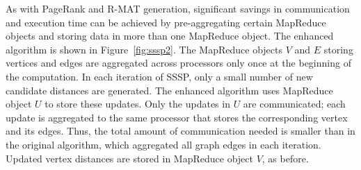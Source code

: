 As with PageRank and R-MAT generation, significant savings in
communication and execution time can be achieved by pre-aggregating
certain MapReduce objects and storing data in more than one MapReduce
object.  The enhanced algorithm is shown in Figure~\ref{fig:sssp2}.
The MapReduce objects $V$ and $E$ storing vertices and edges are
aggregated across processors only once at the beginning of the
computation.  In each iteration of SSSP, only a small number of new
candidate distances are generated.  The enhanced algorithm uses
MapReduce object $U$ to store these updates.  Only the updates in $U$
are communicated; each update is aggregated to the same processor that
stores the corresponding vertex and its edges.  Thus, the total amount
of communication needed is smaller than in the original algorithm,
which aggregated all graph edges in each iteration.  Updated vertex
distances are stored in MapReduce object $V$, as before.

